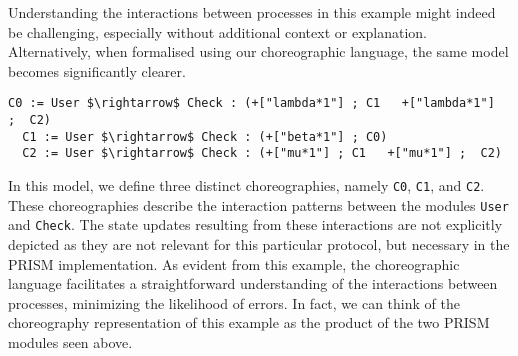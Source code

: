 Understanding the interactions between processes in this example might
indeed be challenging, especially without additional context or
explanation.  Alternatively, when formalised using our choreographic
language, the same model becomes significantly clearer.
\begin{lstlisting}[style=chor-color,% caption={Example of Listing \ref{example1} in our choreographic language},captionpos=b,
  frame=none, label={example2}]
  C0 := User $\rightarrow$ Check : (+["lambda*1"] ; C1	 +["lambda*1"]  ;  C2)
  C1 := User $\rightarrow$ Check : (+["beta*1"] ; C0)  
  C2 := User $\rightarrow$ Check : (+["mu*1"] ; C1   +["mu*1"] ;  C2)
\end{lstlisting}
In this model, we define three distinct choreographies, namely
\texttt{C0}, \texttt{C1}, and \texttt{C2}. These choreographies
describe the interaction patterns between the modules \texttt{User}
and \texttt{Check}. The state updates resulting from these
interactions are not explicitly depicted as they are not relevant for
this particular protocol, but necessary in the PRISM implementation.
%
%
As evident from this example, the choreographic language facilitates a
straightforward understanding of the interactions between processes,
minimizing the likelihood of errors. In fact, we can think of the
choreography representation of this example as the product of the two
PRISM modules seen above.



